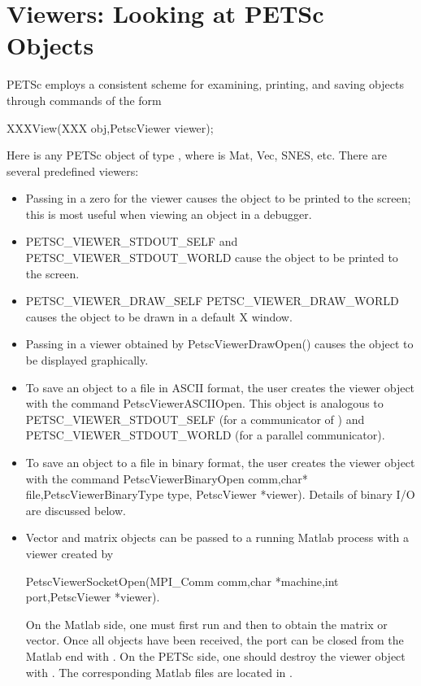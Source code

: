 {{{\section{Viewers: Looking at PETSc Objects} \label{sec_viewers}

PETSc employs a consistent scheme for examining, printing, and 
saving objects through commands of the form
\begin{tabbing}
  XXXView(XXX obj,PetscViewer viewer);
\end{tabbing}
Here  is any PETSc object of type
,  where  
is Mat, Vec, SNES, etc. There are several
predefined viewers:
\begin{itemize}
\item Passing in a zero for the viewer causes the object to be printed 
      to the screen; this is most useful when viewing an object in 
      a debugger.
\item PETSC_VIEWER_STDOUT_SELF and 
      PETSC_VIEWER_STDOUT_WORLD
      cause the object to be printed to the screen.

\item PETSC_VIEWER_DRAW_SELF
      PETSC_VIEWER_DRAW_WORLD causes the 
      object to be drawn in a default X window.
\item Passing in a viewer obtained by
      PetscViewerDrawOpen() causes the object to be displayed graphically.
\item To save an object to a file in ASCII format, the user creates
      the viewer object with the command
      PetscViewerASCIIOpen.  
      This object is 
      analogous to PETSC_VIEWER_STDOUT_SELF (for a communicator of
      ) and 
      PETSC_VIEWER_STDOUT_WORLD (for a parallel communicator).
\item To save an object to a file in binary format, the user creates
      the viewer object with the command
      PetscViewerBinaryOpen comm,char* file,PetscViewerBinaryType type,
      PetscViewer *viewer). Details of binary
      I/O are discussed below.
\item Vector and matrix objects can be passed to a running Matlab process
      with a viewer created by 
\begin{tabbing}
     PetscViewerSocketOpen(MPI\_Comm comm,char *machine,int port,PetscViewer *viewer). 
\end{tabbing} 
      On the Matlab side, one must first run 
      and then  to obtain the matrix or vector. Once all
      objects have been received, the port can be closed from the Matlab end
      with . On the PETSc side, one should destroy
      the viewer object with  . The corresponding Matlab 
      files are located in .
\end{itemize}

}}}
